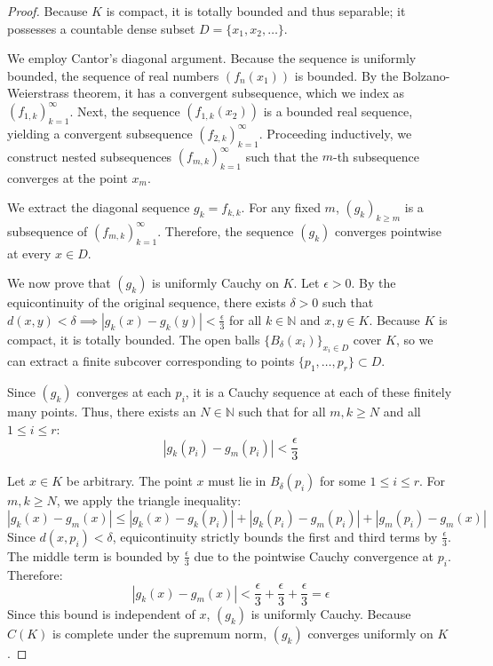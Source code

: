 \begin{proof}
Because $K$ is compact, it is totally bounded and thus separable; it possesses a countable dense subset $D = \{x_1, x_2, \dots\}$. 

We employ Cantor's diagonal argument. Because the sequence is uniformly bounded, the sequence of real numbers $(f_n(x_1))$ is bounded. By the Bolzano-Weierstrass theorem, it has a convergent subsequence, which we index as $(f_{1, k})_{k=1}^\infty$.
Next, the sequence $(f_{1, k}(x_2))$ is a bounded real sequence, yielding a convergent subsequence $(f_{2, k})_{k=1}^\infty$. 
Proceeding inductively, we construct nested subsequences $(f_{m, k})_{k=1}^\infty$ such that the $m$-th subsequence converges at the point $x_m$. 

We extract the diagonal sequence $g_k = f_{k, k}$. For any fixed $m$, $(g_k)_{k \ge m}$ is a subsequence of $(f_{m, k})_{k=1}^\infty$. Therefore, the sequence $(g_k)$ converges pointwise at every $x \in D$.

We now prove that $(g_k)$ is uniformly Cauchy on $K$. Let $\epsilon > 0$. By the equicontinuity of the original sequence, there exists $\delta > 0$ such that $d(x, y) < \delta \implies |g_k(x) - g_k(y)| < \frac{\epsilon}{3}$ for all $k \in \mathbb{N}$ and $x, y \in K$.
Because $K$ is compact, it is totally bounded. The open balls $\{B_\delta(x_i)\}_{x_i \in D}$ cover $K$, so we can extract a finite subcover corresponding to points $\{p_1, \dots, p_r\} \subset D$.

Since $(g_k)$ converges at each $p_i$, it is a Cauchy sequence at each of these finitely many points. Thus, there exists an $N \in \mathbb{N}$ such that for all $m, k \ge N$ and all $1 \le i \le r$:
$$ |g_k(p_i) - g_m(p_i)| < \frac{\epsilon}{3} $$

Let $x \in K$ be arbitrary. The point $x$ must lie in $B_\delta(p_i)$ for some $1 \le i \le r$. For $m, k \ge N$, we apply the triangle inequality:
$$ |g_k(x) - g_m(x)| \le |g_k(x) - g_k(p_i)| + |g_k(p_i) - g_m(p_i)| + |g_m(p_i) - g_m(x)| $$
Since $d(x, p_i) < \delta$, equicontinuity strictly bounds the first and third terms by $\frac{\epsilon}{3}$. The middle term is bounded by $\frac{\epsilon}{3}$ due to the pointwise Cauchy convergence at $p_i$. Therefore:
$$ |g_k(x) - g_m(x)| < \frac{\epsilon}{3} + \frac{\epsilon}{3} + \frac{\epsilon}{3} = \epsilon $$
Since this bound is independent of $x$, $(g_k)$ is uniformly Cauchy. Because $C(K)$ is complete under the supremum norm, $(g_k)$ converges uniformly on $K$.
\end{proof}